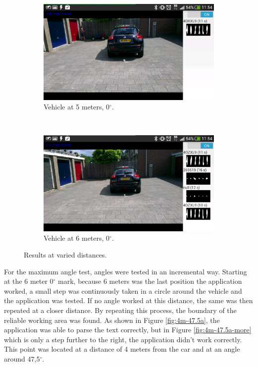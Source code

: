 \begin{figure}[H]
        \begin{subfigure}{0.3\textwidth}
            \includegraphics[width=\textwidth]{plaatjes/test-5m-0a}
            \caption{Vehicle at 5 meters, 0$^{\circ}$.}
            \label{fig:5m-0a}
        \end{subfigure}%
        ~
        \begin{subfigure}{0.3\textwidth}
            \includegraphics[width=\textwidth]{plaatjes/test-6m-0a}
            \caption{Vehicle at 6 meters, 0$^{\circ}$.}
            \label{fig:6m-0a}
        \end{subfigure}%

        \caption{Results at varied distances.}
        \label{fig:distance-test}
\end{figure} %


For the maximum angle test, angles were tested in an incremental way. Starting at the 6 meter 0$^{\circ}$ mark, because 6 meters was the last position the application worked, a small step was continuously taken in a circle around the vehicle and the application was tested. If no angle worked at this distance, the same was then repeated at a closer distance. By repeating this process, the boundary of the reliable working area was found. As shown in Figure \ref{fig:4m-47.5a}, the application was able to parse the text correctly, but in Figure \ref{fig:4m-47.5a-more} which is only a step further to the right, the application didn't work correctly. This point was located at a distance of 4 meters from the car and at an angle around 47,5$^{\circ}$.

